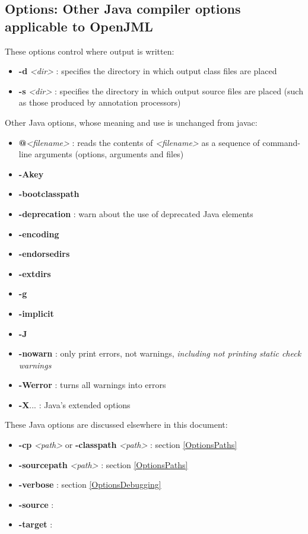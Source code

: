 \documentclass{report}%
\begin{document}
\subsection{Options: Other Java compiler options applicable to OpenJML}

These options control where output is written:
\begin{itemize}
\item \textbf{-d} {\it <dir>} : specifies the directory in which output class files are placed
\item \textbf{-s} {\it <dir>} : specifies the directory in which output source files are placed (such as those produced by annotation processors)
\end{itemize}

Other Java options, whose meaning and use is unchanged from javac:
\begin{itemize}
\item \textbf{@}\textit{<filename>} : reads the contents of \textit{<filename>} as a sequence of command-line arguments (options, arguments and files)
\item \textbf{-Akey}
\item \textbf{-bootclasspath}
\item \textbf{-deprecation} : warn about the use of deprecated Java elements
\item \textbf{-encoding}
\item \textbf{-endorsedirs}
\item \textbf{-extdirs}
\item \textbf{-g}
\item \textbf{-implicit}
\item \textbf{-J}
\item \textbf{-nowarn} : only print errors, not warnings, \textit{including not printing static check warnings}
\item \textbf{-Werror} : turns all warnings into errors
\item \textbf{-X}... : Java's extended options
\end{itemize}

These Java options are discussed elsewhere in this document:
\begin{itemize}
\item \textbf{-cp} \textit{<path>} or \textbf{-classpath} \textit{<path>} : section \ref{OptionsPaths}
\item \textbf{-sourcepath} \textit{<path>} : section \ref{OptionsPaths}
\item \textbf{-verbose} : section \ref{OptionsDebugging}
\item \textbf{-source} :  
\item \textbf{-target} :  
\end{itemize}
\end{document}
